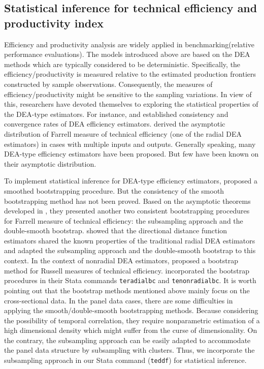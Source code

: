 \subsection{Statistical inference for technical efficiency and productivity index}

Efficiency and productivity analysis are widely applied in benchmarking(relative performance evaluations). The models introduced above are based on the DEA methods which are typically considered to be deterministic. Specifically, the efficiency/productivity is measured relative to the estimated production frontiers constructed by sample observations. Consequently, the measures of efficiency/productivity might be sensitive to the sampling variations. In view of this, researchers have devoted themselves to exploring the statistical properties of the DEA-type estimators. For instance, \cite{banker1993} and \cite{Kneip1998} established consistency and convergence rates of DEA efficiency estimators. \cite{kneip2008} derived the asymptotic distribution of Farrell measure of technical efficiency (one of the radial DEA estimators) in cases with multiple inputs and outputs. Generally speaking, many DEA-type efficiency estimators have been proposed. But few have been known on their asymptotic distribution. 

To implement statistical inference for DEA-type efficiency estimators, \cite{Simar1998} proposed a smoothed bootstrapping procedure. But the consistency of the smooth bootstrapping method has not been proved. Based on the asymptotic theorems developed in \cite{kneip2008}, they presented another two consistent bootstrapping procedures for Farrell measure of technical efficiency: the subsampling approach and the double-smooth bootstrap. \cite{simar2012} showed that the directional distance function estimators shared the known properties of the traditional radial DEA estimators and adapted the subsampling approach and the double-smooth bootstrap to this context. In the context of nonradial DEA estimators, \cite{Badunenko2020} proposed a bootstrap method for Russell measures of technical efficiency. \cite{Badunenko2016} incorporated the bootstrap procedures in their Stata commands {\tt teradialbc} and {\tt tenonradialbc}. It is worth pointing out that the bootstrap methods mentioned above mainly focus on the cross-sectional data. In the panel data cases, there are some difficulties in applying the smooth/double-smooth bootstrapping methods. Because considering the possibility of temporal correlation, they require nonparametric estimation of a high dimensional density which might suffer from the curse of dimensionality. On the contrary, the subsampling approach can be easily adapted to accommodate the panel data structure by subsampling with clusters. Thus, we incorporate the subsampling approach in our Stata command ({\tt teddf}) for statistical inference.

